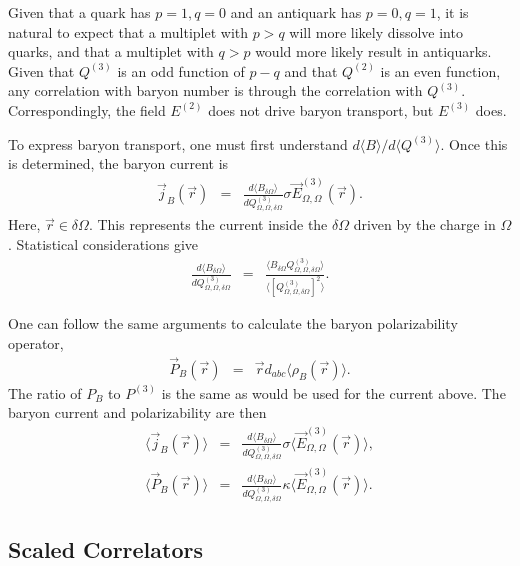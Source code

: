 \documentclass[aps, prc, 12pt, nofootinbib, showpacs, superscriptaddress, tightenlines, groupedaddress]{revtex4-2}
\begin{document}
Given that a quark has $p=1,q=0$ and an antiquark has $p=0,q=1$, it is natural to expect that a multiplet with $p>q$ will more likely dissolve into quarks, and that a multiplet with $q>p$ would more likely result in antiquarks. Given that $Q^{(3)}$ is an odd function of $p-q$ and that $Q^{(2)}$ is an even function, any correlation with baryon number is through the correlation with $Q^{(3)}$. Correspondingly, the field $E^{(2)}$ does not drive baryon transport, but $E^{(3)}$ does.

To express baryon transport, one must first understand $d\langle B\rangle/d\langle Q^{(3)}\rangle$. Once this is determined, the baryon current is
\begin{eqnarray}
\vec{j}_B(\vec{r})&=&\frac{d\langle B_{\delta\Omega}\rangle}{dQ^{(3)}_{\Omega,\Omega,\delta\Omega}}\sigma \vec{E}^{(3)}_{\Omega,\Omega}(\vec{r}).
\end{eqnarray}
Here, $\vec{r}\in\delta\Omega$. This represents the current inside the $\delta\Omega$ driven by the charge in $\Omega$. Statistical considerations give
\begin{eqnarray}
\frac{d\langle B_{\delta\Omega}\rangle}{dQ^{(3)}_{\Omega,\Omega,\delta\Omega}}&=&
\frac{\langle B_{\delta\Omega} Q^{(3)}_{\Omega,\Omega,\delta\Omega}\rangle}
{\langle [Q^{(3)}_{\Omega,\Omega,\delta\Omega}]^2  \rangle}.
\end{eqnarray}

One can follow the same arguments to calculate the baryon polarizability operator,
\begin{eqnarray}
\vec{P}_B(\vec{r})&=&\vec{r}d_{abc}\langle \rho_B(\vec{r})\rangle.
\end{eqnarray}
The ratio of $P_B$ to $P^{(3)}$ is the same as would be used for the current above. The baryon current and polarizability are then
\begin{eqnarray}
\langle\vec{j}_B(\vec{r})\rangle&=&\frac{d\langle B_{\delta\Omega}\rangle}{dQ^{(3)}_{\Omega,\Omega,\delta\Omega}}\sigma
\langle\vec{E}^{(3)}_{\Omega,\Omega}(\vec{r})\rangle,\\
\nonumber
\langle\vec{P}_B(\vec{r})\rangle&=&\frac{d\langle B_{\delta\Omega}\rangle}{dQ^{(3)}_{\Omega,\Omega,\delta\Omega}}\kappa
\langle\vec{E}^{(3)}_{\Omega,\Omega}(\vec{r})\rangle.
\end{eqnarray}

\subsection{Scaled Correlators}
\end{document}

